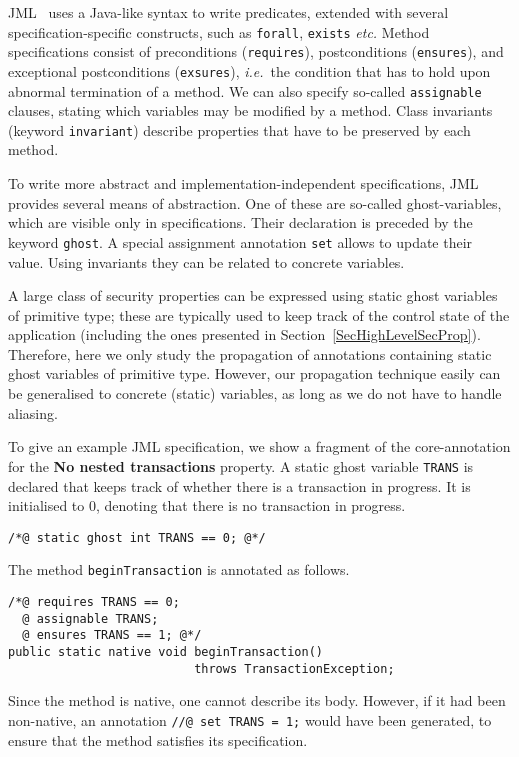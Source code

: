 JML~\cite{BurdyCCEKLLP03} uses a Java-like syntax to write predicates,
extended with several specification-specific constructs, such as
\texttt{\bsl forall},
\texttt{\bsl exists} \emph{etc.} Method specifications consist of 
preconditions (\texttt{requires}), postconditions (\texttt{ensures}),
and exceptional postconditions (\texttt{exsures}), \emph{i.e.}\/~the
condition that has to hold upon abnormal termination of a method. We
can also specify so-called
\texttt{assignable} clauses, stating which variables may be modified
by a method. Class invariants (keyword \texttt{invariant}) describe
properties that have to be preserved by each method.

To write more abstract and implementation-independent specifications,
JML provides several means of abstraction. One of these are 
so-called ghost-variables, which are visible only in
specifications. Their declaration is preceded by the keyword
\texttt{ghost}. A special assignment annotation \texttt{set} allows
to update their value. Using invariants they can be related to concrete
variables.

A large class of security properties can be expressed using static
ghost variables of primitive type; these are typically used to keep
track of the control state of the application (including the ones
presented in Section~\ref{SecHighLevelSecProp}). Therefore, here we
only study the propagation of annotations containing static ghost
variables of primitive type. However, our propagation technique easily
can be generalised to concrete (static) variables, as long as we do
not have to handle aliasing.


 

To give an example JML specification, we show a fragment of the
core-annotation for the \textbf{No nested transactions} property.  A
static ghost variable \texttt{TRANS} is declared that keeps track
of whether there is a transaction in progress. It is initialised to 0,
denoting that there is no transaction in progress.
\begin{verbatim}
/*@ static ghost int TRANS == 0; @*/
\end{verbatim}
The method \texttt{beginTransaction} is annotated as follows.
\begin{verbatim}
/*@ requires TRANS == 0;
  @ assignable TRANS;
  @ ensures TRANS == 1; @*/
public static native void beginTransaction() 
                          throws TransactionException;
\end{verbatim}
Since the method is native, one cannot describe its body. However, if
it had been non-native, an annotation \texttt{//@ set TRANS = 1;}
would have been generated, to ensure that the method satisfies its
specification.

